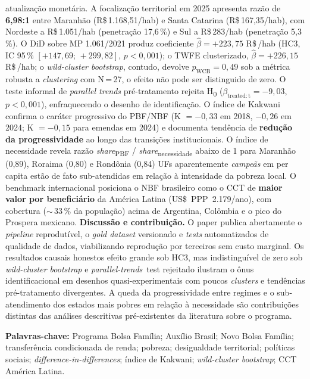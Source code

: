\documentclass[12pt,a4paper,oneside]{article}
\newcommand{\rs}{R\$\,}
\begin{document}
\begin{singlespace}
atualização monetária. A focalização territorial em 2025 apresenta
razão de \textbf{6,98:1} entre Maranhão (\rs 1.168,51/hab) e Santa
Catarina (\rs 167,35/hab), com Nordeste a \rs 1.051/hab
(penetração 17,6\,\%) e Sul a \rs 283/hab (penetração 5,3\,\%). O
DiD sobre MP 1.061/2021 produz coeficiente $\hat\beta = +223,75$
\rs/hab (HC3, IC 95\,\% $[+147,69;\,+299,82]$, $p < 0,001$); o TWFE
clusterizado, $\hat\beta = +226,15$ \rs/hab; o
\textit{wild-cluster bootstrap}, contudo, devolve $p_{\mathrm{WCB}}
= 0,49$ \textemdash{} sob a métrica robusta a \textit{clustering}
com N\,=\,27, o efeito não pode ser distinguido de zero. O teste
informal de \textit{parallel trends} pré-tratamento rejeita H\textsubscript{0}
($\beta_{\mathrm{treated:t}} = -9,03$, $p < 0,001$), enfraquecendo
o desenho de identificação. O índice de Kakwani confirma o caráter
progressivo do PBF/NBF (K $= -0,33$ em 2018, $-0,26$ em 2024;
K $= -0,15$ para emendas em 2024) e documenta tendência de
\textbf{redução da progressividade} ao longo das transições
institucionais. O índice de necessidade revela razão
\textit{share}\textsubscript{PBF} / \textit{share}\textsubscript{necessidade}
abaixo de 1 para Maranhão (0,89), Roraima (0,80) e Rondônia (0,84)
\textemdash{} UFs aparentemente \textit{campeãs} em per capita
estão de fato sub-atendidas em relação à intensidade da pobreza
local. O benchmark internacional posiciona o NBF brasileiro como o
CCT de \textbf{maior valor por beneficiário} da América Latina
(US\$~PPP~2.179/ano), com cobertura ($\sim$\,33\,\% da população)
acima de Argentina, Colômbia e o pico do Prospera mexicano.
\textbf{Discussão e contribuição.} O paper publica abertamente o
\textit{pipeline} reprodutível, o \textit{gold dataset} versionado e
\textit{tests} automatizados de qualidade de dados, viabilizando
reprodução por terceiros sem custo marginal. Os resultados causais
honestos \textemdash{} efeito grande sob HC3, mas indistinguível de
zero sob \textit{wild-cluster bootstrap} e
\textit{parallel-trends}~test rejeitado \textemdash{} ilustram o
ônus identificacional em desenhos quasi-experimentais com poucos
\textit{clusters} e tendências pré-tratamento divergentes. A
queda da progressividade entre regimes e o sub-atendimento dos
estados mais pobres em relação à necessidade são contribuições
distintas das análises descritivas pré-existentes da literatura
sobre o programa.

\vspace{0.4cm}\noindent\textbf{Palavras-chave:}
Programa Bolsa Família; Auxílio Brasil; Novo Bolsa Família;
transferência condicionada de renda; pobreza; desigualdade
territorial; políticas sociais; \textit{difference-in-differences};
índice de Kakwani; \textit{wild-cluster bootstrap}; CCT América
Latina.
\end{singlespace}
\end{document}
